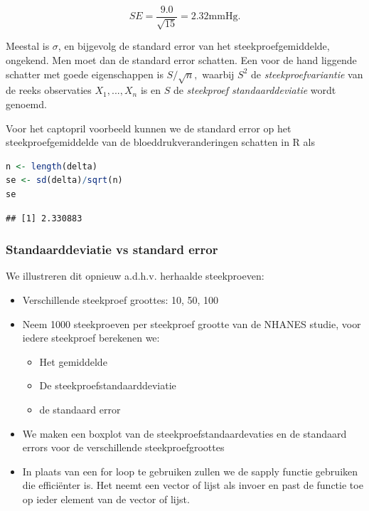 \documentclass[
  12pt,dutch,coursenotes]{book}
\providecommand{\tightlist}{%
  \setlength{\itemsep}{0pt}\setlength{\parskip}{0pt}}
\begin{document}
\[
SE= \frac{9.0}{\sqrt{15}}=2.32\text{mmHg.}
\]

Meestal is \(\sigma\), en bijgevolg de standard error van het
steekproefgemiddelde, ongekend. Men moet dan de standard error schatten.
Een voor de hand liggende schatter met goede eigenschappen is \(S/\sqrt{n},\)
waarbij \(S^2\) de \emph{steekproefvariantie} van de reeks observaties \(X_1,...,X_n\) is en \(S\) de \emph{steekproef standaarddeviatie} wordt genoemd.

Voor het captopril voorbeeld kunnen we de standard error op het steekproefgemiddelde van de bloeddrukveranderingen schatten in R als

\begin{lstlisting}[language=R]
n <- length(delta)
se <- sd(delta)/sqrt(n)
se
\end{lstlisting}

\begin{lstlisting}
## [1] 2.330883
\end{lstlisting}

\hypertarget{standaarddeviatie-vs-standard-error}{%
\subsubsection{Standaarddeviatie vs standard error}\label{standaarddeviatie-vs-standard-error}}

We illustreren dit opnieuw a.d.h.v. herhaalde steekproeven:

\begin{itemize}
\item
  Verschillende steekproef groottes: 10, 50, 100
\item
  Neem 1000 steekproeven per steekproef grootte van de NHANES studie, voor iedere steekproef berekenen we:

  \begin{itemize}
  \tightlist
  \item
    Het gemiddelde
  \item
    De steekproefstandaarddeviatie
  \item
    de standaard error
  \end{itemize}
\item
  We maken een boxplot van de steekproefstandaardevaties en de standaard errors voor de verschillende steekproefgroottes
\item
  In plaats van een for loop te gebruiken zullen we de sapply functie gebruiken die efficiënter is. Het neemt een vector of lijst als invoer en past de functie toe op ieder element van de vector of lijst.
\end{itemize}
\end{document}
